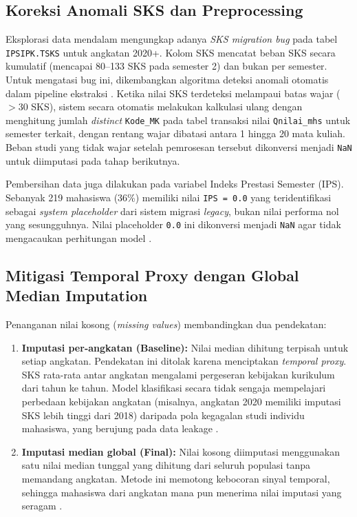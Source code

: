 \documentclass{ieeeaccess}
\begin{document}
\subsection{Koreksi Anomali SKS dan Preprocessing}
Eksplorasi data mendalam mengungkap adanya \emph{SKS migration bug} pada tabel \texttt{IPSIPK.TSKS} untuk angkatan 2020+. Kolom SKS mencatat beban SKS secara kumulatif (mencapai 80--133 SKS pada semester 2) dan bukan per semester. Untuk mengatasi bug ini, dikembangkan algoritma deteksi anomali otomatis dalam pipeline ekstraksi \cite{ref24}. Ketika nilai SKS terdeteksi melampaui batas wajar ($>30$ SKS), sistem secara otomatis melakukan kalkulasi ulang dengan menghitung jumlah \emph{distinct} \texttt{Kode\_MK} pada tabel transaksi nilai \texttt{Qnilai\_mhs} untuk semester terkait, dengan rentang wajar dibatasi antara 1 hingga 20 mata kuliah. Beban studi yang tidak wajar setelah pemrosesan tersebut dikonversi menjadi \texttt{NaN} untuk diimputasi pada tahap berikutnya.

Pembersihan data juga dilakukan pada variabel Indeks Prestasi Semester (IPS). Sebanyak 219 mahasiswa (36\%) memiliki nilai \texttt{IPS = 0.0} yang teridentifikasi sebagai \emph{system placeholder} dari sistem migrasi \emph{legacy}, bukan nilai performa nol yang sesungguhnya. Nilai placeholder \texttt{0.0} ini dikonversi menjadi \texttt{NaN} agar tidak mengacaukan perhitungan model \cite{ref26}.

\subsection{Mitigasi Temporal Proxy dengan Global Median Imputation}
Penanganan nilai kosong (\emph{missing values}) membandingkan dua pendekatan:
\begin{enumerate}
    \item \textbf{Imputasi per-angkatan (Baseline):} Nilai median dihitung terpisah untuk setiap angkatan. Pendekatan ini ditolak karena menciptakan \emph{temporal proxy}. SKS rata-rata antar angkatan mengalami pergeseran kebijakan kurikulum dari tahun ke tahun. Model klasifikasi secara tidak sengaja mempelajari perbedaan kebijakan angkatan (misalnya, angkatan 2020 memiliki imputasi SKS lebih tinggi dari 2018) daripada pola kegagalan studi individu mahasiswa, yang berujung pada data leakage \cite{ref25}.
    \item \textbf{Imputasi median global (Final):} Nilai kosong diimputasi menggunakan satu nilai median tunggal yang dihitung dari seluruh populasi tanpa memandang angkatan. Metode ini memotong kebocoran sinyal temporal, sehingga mahasiswa dari angkatan mana pun menerima nilai imputasi yang seragam \cite{ref23}.
\end{enumerate}
\end{document}
